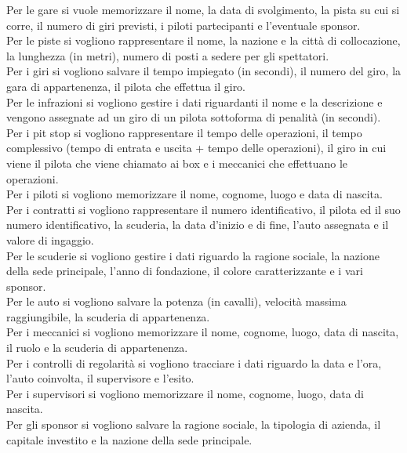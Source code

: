 \documentclass[11pt]{article}
\begin{document}
Per le gare si vuole memorizzare il nome, la data di svolgimento, la pista su cui si corre, il numero di giri previsti, i piloti partecipanti e l'eventuale sponsor. \\
Per le piste si vogliono rappresentare il nome, la nazione e la città di collocazione, la lunghezza (in metri), numero di posti a sedere per gli spettatori. \\
Per i giri si vogliono salvare il tempo impiegato (in secondi), il numero del giro, la gara di appartenenza, il pilota che effettua il giro. \\
Per le infrazioni si vogliono gestire i dati riguardanti il nome e la descrizione e vengono assegnate ad un giro di un pilota sottoforma di penalità (in secondi). \\
Per i pit stop si vogliono rappresentare il tempo delle operazioni, il tempo complessivo (tempo di entrata e uscita + tempo delle operazioni), il giro in cui viene il pilota che viene chiamato ai box e i meccanici che effettuano le operazioni. \\
Per i piloti si vogliono memorizzare il nome, cognome, luogo e data di nascita. \\
Per i contratti si vogliono rappresentare il numero identificativo, il pilota ed il suo numero identificativo, la scuderia, la data d'inizio e di fine, l'auto assegnata e il valore di ingaggio. \\
Per le scuderie si vogliono gestire i dati riguardo la ragione sociale, la nazione della sede principale, l'anno di fondazione, il colore caratterizzante e i vari sponsor. \\ 
Per le auto si vogliono salvare la potenza (in cavalli), velocità massima raggiungibile, la scuderia di appartenenza. \\
Per i meccanici si vogliono memorizzare il nome, cognome, luogo, data di nascita, il ruolo e la scuderia di appartenenza. \\
Per i controlli di regolarità si vogliono tracciare i dati riguardo la data e l'ora, l'auto coinvolta, il supervisore e l'esito. \\
Per i supervisori si vogliono memorizzare il nome, cognome, luogo, data di nascita. \\
Per gli sponsor si vogliono salvare la ragione sociale, la tipologia di azienda, il capitale investito e la nazione della sede principale.
\end{document}
